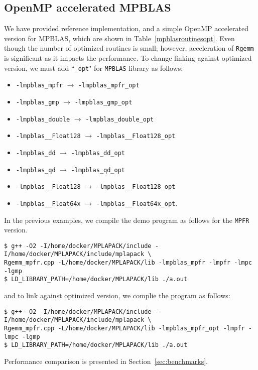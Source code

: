 \documentclass[12pt]{article}
\begin{document}
\subsection{OpenMP accelerated MPBLAS}
We have provided reference implementation, and a simple OpenMP accelerated version for MPBLAS, which are shown in Table~\ref{mpblasroutinesopt}. Even though the number of optimized routines is small; however, acceleration of {\tt Rgemm} is significant as it impacts the performance.
To change linking against optimized version, we must add ``{\tt \_opt}" for {\tt MPBLAS} library as follows:
\begin{itemize}
    \item {\tt -lmpblas\_mpfr} $\rightarrow$ {\tt -lmpblas\_mpfr\_opt} 
    \item {\tt -lmpblas\_gmp} $\rightarrow$ {\tt -lmpblas\_gmp\_opt} 
    \item {\tt -lmpblas\_double} $\rightarrow$ {\tt -lmpblas\_double\_opt} 
    \item {\tt -lmpblas\_\_Float128} $\rightarrow$ {\tt -lmpblas\_\_Float128\_opt} 
    \item {\tt -lmpblas\_dd} $\rightarrow$ {\tt -lmpblas\_dd\_opt} 
    \item {\tt -lmpblas\_qd} $\rightarrow$ {\tt -lmpblas\_qd\_opt} 
    \item {\tt -lmpblas\_\_Float128} $\rightarrow$ {\tt -lmpblas\_\_Float128\_opt} 
    \item {\tt -lmpblas\_\_Float64x} $\rightarrow$ {\tt -lmpblas\_\_Float64x\_opt}.
\end{itemize}

In the previous examples, we compile the demo program as follows for the {\tt MPFR} version.
\begin{verbatim}
$ g++ -O2 -I/home/docker/MPLAPACK/include -I/home/docker/MPLAPACK/include/mplapack \
Rgemm_mpfr.cpp -L/home/docker/MPLAPACK/lib -lmpblas_mpfr -lmpfr -lmpc -lgmp
$ LD_LIBRARY_PATH=/home/docker/MPLAPACK/lib ./a.out
\end{verbatim}
and to link against optimized version, we complie the program as follows:
\begin{verbatim}
$ g++ -O2 -I/home/docker/MPLAPACK/include -I/home/docker/MPLAPACK/include/mplapack \
Rgemm_mpfr.cpp -L/home/docker/MPLAPACK/lib -lmpblas_mpfr_opt -lmpfr -lmpc -lgmp
$ LD_LIBRARY_PATH=/home/docker/MPLAPACK/lib ./a.out
\end{verbatim}

Performance comparison is presented in Section~\ref{sec:benchmarks}.
\end{document}
